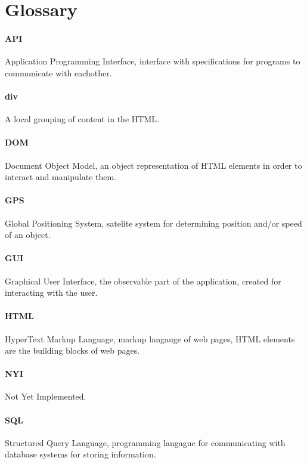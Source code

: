 \section{Glossary}

\paragraph{API} Application Programming Interface, interface with specifications for programs to communicate with eachother.

\paragraph{div} A local grouping of content in the HTML.

\paragraph{DOM} Document Object Model, an object representation of HTML elements in order to interact and manipulate them.

\paragraph{GPS} Global Positioning System, satelite system for determining position and/or speed of an object.

\paragraph{GUI} Graphical User Interface, the observable part of the application, created for interacting with the user.

\paragraph{HTML} HyperText Markup Language, markup langauge of web pages, HTML elements are the building blocks of web pages.

\paragraph{NYI} Not Yet Implemented.

\paragraph{SQL} Structured Query Language, programming langague for communicating with database systems for storing information.
